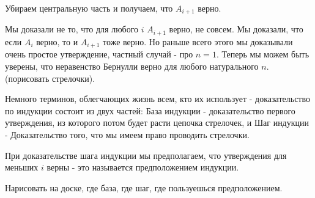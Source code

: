 Убираем центральную часть и получаем, что $A_{i + 1}$ верно.

Мы доказали не то, что для любого $i$ $A_{i + 1}$ верно, не совсем. Мы доказали, что если $A_i$
верно, то и $A_{i + 1}$ тоже верно. Но раньше всего этого мы доказывали очень простое утверждение,
частный случай - про $n = 1$. Теперь мы можем быть уверены, что неравенство Бернулли верно для
любого натурального $n$. (порисовать стрелочки).

Немного терминов, облегчающих жизнь всем, кто их использует - доказательство по индукции состоит из
двух частей: База индукции - доказательство первого утверждения, из которого потом будет расти
цепочка стрелочек, и Шаг индукции - Доказательство того, что мы имеем право проводить стрелочки.

При доказательстве шага индукции мы предполагаем, что утверждения для меньших $i$ верны - это
называется предположением индукции.

Нарисовать на доске, где база, где шаг, где пользуешься предположением.
